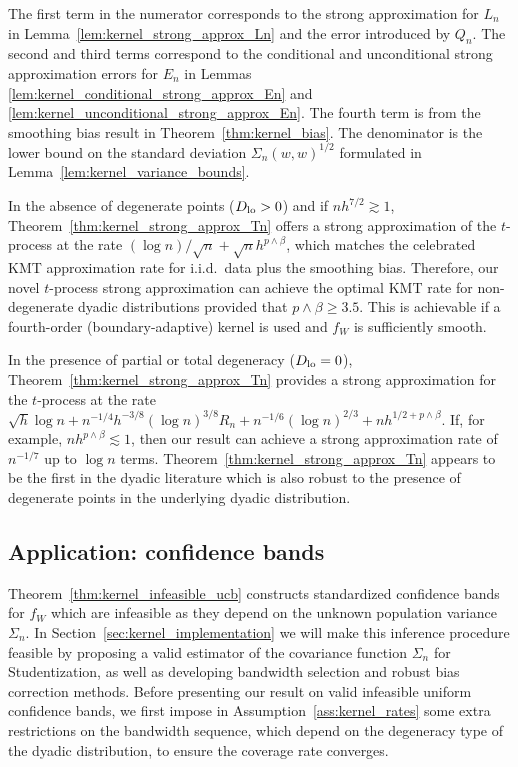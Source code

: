 \documentclass[11pt,lof]{puthesis}
\newcommand{\Dl}{\ensuremath{D_{\textup{lo}}}}
\theoremstyle{break}
\theoremstyle{proof}
\begin{document}
The first term in the numerator corresponds to the strong approximation for
$L_n$ in Lemma~\ref{lem:kernel_strong_approx_Ln} and the error introduced by
$Q_n$.
The second and third terms correspond to the conditional and unconditional
strong approximation errors for $E_n$ in Lemmas
\ref{lem:kernel_conditional_strong_approx_En} and
\ref{lem:kernel_unconditional_strong_approx_En}.
The fourth term is from
the smoothing bias result in Theorem~\ref{thm:kernel_bias}. The denominator is
the lower bound on the standard deviation $\Sigma_n(w,w)^{1/2}$ formulated in
Lemma~\ref{lem:kernel_variance_bounds}.

In the absence of degenerate points ($\Dl > 0$) and if $n h^{7/2}\gtrsim 1$,
Theorem~\ref{thm:kernel_strong_approx_Tn} offers a strong approximation of the
$t$-process at the rate $(\log n)/\sqrt{n}+\sqrt{n}h^{p\wedge\beta}$, which
matches the celebrated KMT approximation rate for i.i.d.\ data plus the
smoothing bias. Therefore, our novel $t$-process strong approximation can
achieve the optimal KMT rate for non-degenerate dyadic distributions provided
that $p\wedge\beta \geq 3.5$. This is achievable if a fourth-order
(boundary-adaptive) kernel is used and $f_W$ is sufficiently smooth.

In the presence of partial or total degeneracy ($\Dl =0$),
Theorem~\ref{thm:kernel_strong_approx_Tn} provides a strong approximation for
the
$t$-process at the rate
$\sqrt{h}\log n + n^{-1/4}h^{-3/8}(\log n)^{3/8} R_n + n^{-1/6}(\log n)^{2/3}
+ n h^{1/2+p\wedge\beta}$. If, for example, $n h^{p\wedge\beta}\lesssim 1$,
then our result can achieve a strong approximation rate of $n^{-1/7}$ up to
$\log n $ terms. Theorem~\ref{thm:kernel_strong_approx_Tn} appears to be the
first in the dyadic literature which is also robust to the presence of
degenerate points in the underlying dyadic distribution.

\subsection{Application: confidence bands}

Theorem~\ref{thm:kernel_infeasible_ucb} constructs standardized confidence
bands for
$f_W$ which are infeasible as they depend on the unknown population variance
$\Sigma_n$. In Section~\ref{sec:kernel_implementation} we will make this
inference
procedure feasible by proposing a valid estimator of the covariance function
$\Sigma_n$ for Studentization, as well as developing bandwidth selection and
robust bias correction methods. Before presenting our result on valid
infeasible uniform confidence bands, we first impose in
Assumption~\ref{ass:kernel_rates} some extra restrictions on the bandwidth
sequence,
which depend on the degeneracy type of the dyadic distribution, to ensure the
coverage rate converges.
\end{document}
